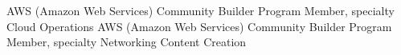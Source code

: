 %
%
%


\begin{scholarship}
					{AWS (Amazon Web Services) Community Builder Program Member, specialty Cloud Operations}
					{AWS (Amazon Web Services) Community Builder Program Member, specialty Networking Content Creation}
\end{scholarship}